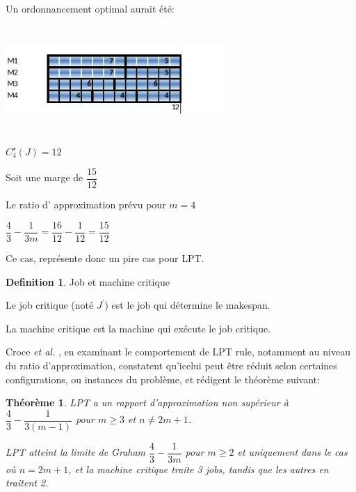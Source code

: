 \documentclass[a4paper,12pt]{report}
\theoremstyle{plain}				%
\newtheorem{theoreme1}{Théorème}	%
\theoremstyle{definition}				%
\newtheorem{definition1}{Definition} %
\begin{document}
\begin{minipage}{\linewidth}

\begin{flushleft}
Un ordonnancement optimal aurait été:
\end{flushleft}

{\centering
\includegraphics[width=8.334cm,height=4.034cm]{Biblio_PCmax_Rendu_exLPT_Rev2.jpg}
\par}


\begin{flushleft}
$C_4^{\star}(J)=12$
\end{flushleft}

\end{minipage}

Soit une marge de $\dfrac{15}{12}$

Le ratio d' approximation prévu pour $m=4$

$\dfrac{4}{3} - \dfrac{1}{3m}=\dfrac{16}{12} - \dfrac{1}{12}=\dfrac{15}{12}$

Ce cas, représente donc un pire cas pour LPT.

\bigskip
\begin{definition1}{Job et machine critique}

Le job critique (noté $J^\prime$) est le job qui détermine le
makespan.

La machine critique est la machine qui exécute le job critique.
\end{definition1}


\bigskip

Croce \textit{et al.}
\cite{della2018longest}, en examinant le comportement de LPT rule,
notamment au niveau du ratio d'approximation, constatent qu'icelui
peut être réduit selon certaines configurations, ou instances du
problème, et rédigent le théorème suivant:

\bigskip

\begin{theoreme1}

  LPT a un rapport d'approximation non supérieur à
  $\dfrac{4}{3} - \dfrac{1}{3(m-1)}$ pour $m \geq 3$ et $n \neq 2m+1$.

  LPT atteint la limite de Graham $\dfrac{4}{3} - \dfrac{1}{3m}$ pour
  $m \geq 2$ et uniquement dans le cas où $n=2m+1$, et la machine
  critique traite 3 jobs, tandis que les autres en traitent 2.

\end{theoreme1}
\end{document}
